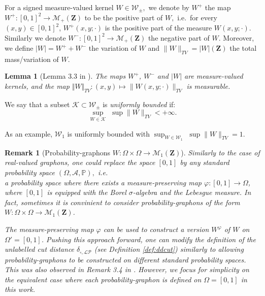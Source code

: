 \documentclass[11pt]{article}
\newtheorem{lemma}[theorem]{Lemma}
\newtheorem{remark}[theorem]{Remark}
\def\P{\mathbb{P}}
\newcommand{\cK}{{\mathcal K}}  %
\newcommand{\Space}{\mathbf{Z}}
\newcommand{\signed}{\pm}
\newcommand{\Proba}{\mathcal{M}_1(\Space)}
\newcommand{\Meas}{\mathcal{M}_+(\Space)}
\newcommand{\Graphon}{\mathcal{W}_1}
\newcommand{\Kernel}{\mathcal{W}_{\signed}}
\renewcommand{\P}{\mathbb{P}}
\begin{document}
For a signed measure-valued kernel $W \in \Kernel,$ we denote by $W^+$ the map $W^+ : [0,1]^2 \to \Meas$ to be the positive part of $W,$ i.e.\ for every $(x,y)\in [0,1]^2$, $W^+(x,y;\cdot)$ is the positive part of the measure $W(x,y;\cdot)$. Similarly we denote $W^- : [0,1]^2 \to \Meas$ the negative part of $W.$
Moreover, we define $\vert W \vert = W^+ + W^-$ the variation of $W$ and $\| W \|_{TV} = \vert W \vert (\Space)$ the total mass/variation of $W.$


\begin{lemma}[Lemma 3.3 in \cite{abraham2023probabilitygraphons}]\label{lem:mesurability_W_+}
The maps $W^+$, $W^-$ and $\vert W \vert$ are measure-valued kernels, and the map $\Vert W \Vert_{TV} : (x,y) \mapsto\|W(x,y;\cdot)\|_{TV}$ is measurable.
\end{lemma}

We say that a subset  $\cK\subset \Kernel$ is \emph{uniformly bounded} if:
\begin{equation}\label{eq_def_TM_graphon}
\sup_{W\in \cK}\,\, \sup \|W\|_{TV}  < +\infty .
\end{equation}

As an example, $\Graphon$ is uniformly bounded with $\sup_{W\in \Graphon}\,\, \sup\|W\|_{TV}  =1.$

\begin{remark}[Probability-graphons $W : \Omega\times \Omega \to \Proba$]
	\label{rem_vertex_type_omega}
Similarly to the case of real-valued graphons, one could replace the space $[0,1]$ by any standard probability space $(\Omega,\mathcal{A},\P),$ i.e.\\ a probability space where there exists a measure-preserving map $\varphi : [0,1] \to \Omega$, where $[0,1]$ is equipped with the Borel $\sigma$-algebra and the Lebesgue measure. In fact, sometimes it is convinient to consider probability-graphons of the form $W : \Omega\times \Omega \to \Proba$.

The measure-preserving map $\varphi$ can be used to construct a version $W^\varphi$ of $W$ on $\Omega' = [0,1]$. Pushing this approach forward, one can modify the definition of the unlabelled cut distance $\delta_{\square,\mathcal{LP}}$ (see Definition \ref{def:ddcut}) similarly to \cite[Theorem 6.9]{jansonGraphonsCutNorm2013} allowing probability-graphons to be constructed on different standard probability spaces. This was also observed in Remark 3.4 in \cite{abraham2023probabilitygraphons}. However, we focus for simplicity on the equivalent case where each probability-graphon is defined on $\Omega = [0,1]$ in this work.
\end{remark}
\end{document}
